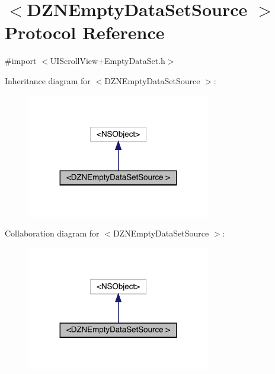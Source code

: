 \hypertarget{protocol_d_z_n_empty_data_set_source_01-p}{}\section{$<$D\+Z\+N\+Empty\+Data\+Set\+Source $>$ Protocol Reference}
\label{protocol_d_z_n_empty_data_set_source_01-p}


{\ttfamily \#import $<$U\+I\+Scroll\+View+\+Empty\+Data\+Set.\+h$>$}



Inheritance diagram for $<$D\+Z\+N\+Empty\+Data\+Set\+Source $>$\+:\nopagebreak
\begin{figure}[H]
\begin{center}
\leavevmode
\includegraphics[width=227pt]{protocol_d_z_n_empty_data_set_source_01-p__inherit__graph}
\end{center}
\end{figure}


Collaboration diagram for $<$D\+Z\+N\+Empty\+Data\+Set\+Source $>$\+:\nopagebreak
\begin{figure}[H]
\begin{center}
\leavevmode
\includegraphics[width=227pt]{protocol_d_z_n_empty_data_set_source_01-p__coll__graph}
\end{center}
\end{figure}
